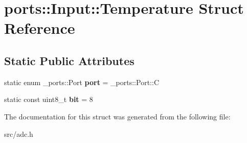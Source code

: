 \hypertarget{structports_1_1Input_1_1Temperature}{}\section{ports\+:\+:Input\+:\+:Temperature Struct Reference}
\label{structports_1_1Input_1_1Temperature}
\subsection*{Static Public Attributes}
\begin{DoxyCompactItemize}
\item 
static enum \+\_\+ports\+::\+Port {\bfseries port} = \+\_\+ports\+::\+Port\+::C\hypertarget{structports_1_1Input_1_1Temperature_a9302391e9f64c57d6d6a385dbb841396}{}\label{structports_1_1Input_1_1Temperature_a9302391e9f64c57d6d6a385dbb841396}

\item 
static const uint8\+\_\+t {\bfseries bit} = 8\hypertarget{structports_1_1Input_1_1Temperature_a1e3a84ae7c94b92631711f142f3ce7ee}{}\label{structports_1_1Input_1_1Temperature_a1e3a84ae7c94b92631711f142f3ce7ee}

\end{DoxyCompactItemize}


The documentation for this struct was generated from the following file\+:\begin{DoxyCompactItemize}
\item 
src/adc.\+h\end{DoxyCompactItemize}
